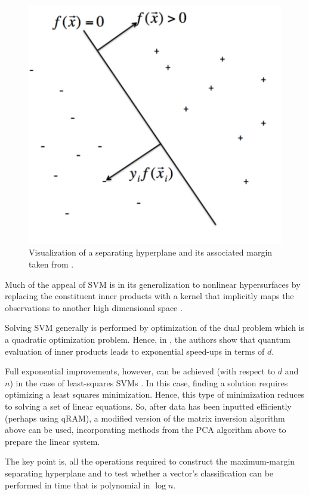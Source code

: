 \documentclass[12]{amsart}
\newcommand\0{\mathbf{0}}
\newcommand\<{\langle}
\renewcommand\>{\rangle}
\begin{document}
\begin{figure}[H]
\centering
\includegraphics[width=0.5\linewidth]{svm.png}	
\caption{Visualization of a separating hyperplane and its associated margin taken from \cite{rudin}.}
\end{figure}

Much of the appeal of SVM is in its generalization to nonlinear hypersurfaces by replacing the constituent inner products with a kernel that implicitly maps the observations to another high dimensional space \cite{rudin}.%

Solving SVM generally is performed by optimization of the dual problem which is a quadratic optimization problem. Hence, in \cite{rebentrost2014quantum}, the authors show that quantum evaluation of inner products leads to exponential speed-ups in terms of $d$. 

Full exponential improvements, however, can be achieved (with respect to $d$ and $n$) in the case of least-squares SVMs \cite{rebentrost2014quantum}. In this case, finding a solution requires optimizing a least squares minimization. Hence, this type of minimization reduces to solving a set of linear equations. So, after data has been inputted efficiently (perhaps using qRAM), a modified version of the matrix inversion algorithm above can be used, incorporating methods from the PCA algorithm above to prepare the linear system.

The key point is, all the operations required to construct the maximum-margin separating hyperplane and to test whether a vector's classification can be performed in time that is polynomial in $\log n$.

\end{document}
